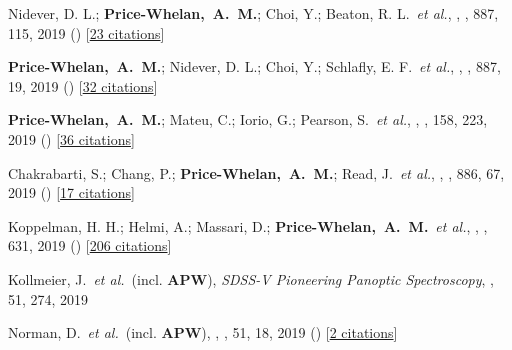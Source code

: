 \item[{\color{deemph}\scriptsize68}]Nidever, D. L.; \textbf{Price-Whelan,~A.~M.}; Choi, Y.; Beaton, R. L.~\textit{et al.}, , \apj, 887, 115, 2019 () [\href{http://adsabs.harvard.edu/abs/2019ApJ...887..115N}{23 citations}]

\item[{\color{deemph}\scriptsize67}]\textbf{Price-Whelan,~A.~M.}; Nidever, D. L.; Choi, Y.; Schlafly, E. F.~\textit{et al.}, , \apj, 887, 19, 2019 () [\href{http://adsabs.harvard.edu/abs/2019ApJ...887...19P}{32 citations}]

\item[{\color{deemph}\scriptsize66}]\textbf{Price-Whelan,~A.~M.}; Mateu, C.; Iorio, G.; Pearson, S.~\textit{et al.}, , \aj, 158, 223, 2019 () [\href{http://adsabs.harvard.edu/abs/2019AJ....158..223P}{36 citations}]

\item[{\color{deemph}\scriptsize65}]Chakrabarti, S.; Chang, P.; \textbf{Price-Whelan,~A.~M.}; Read, J.~\textit{et al.}, , \apj, 886, 67, 2019 () [\href{http://adsabs.harvard.edu/abs/2019ApJ...886...67C}{17 citations}]

\item[{\color{deemph}\scriptsize64}]Koppelman, H. H.; Helmi, A.; Massari, D.; \textbf{Price-Whelan,~A.~M.}~\textit{et al.}, , \aanda, 631, 2019 () [\href{http://adsabs.harvard.edu/abs/2019A&A...631L...9K}{206 citations}]

\item[{\color{deemph}\scriptsize63}]Kollmeier, J.~\textit{et al.}~(incl. \textbf{APW}), \textit{SDSS-V Pioneering Panoptic Spectroscopy}, \baas, 51, 274, 2019

\item[{\color{deemph}\scriptsize62}]Norman, D.~\textit{et al.}~(incl. \textbf{APW}), , \baas, 51, 18, 2019 () [\href{http://adsabs.harvard.edu/abs/2019BAAS...51g..18N}{2 citations}]

